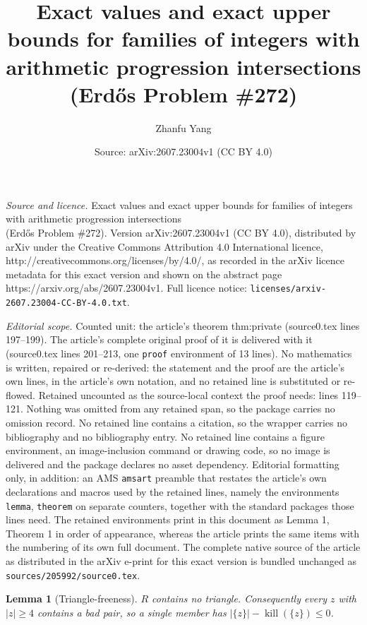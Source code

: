 \documentclass[10pt,a4paper]{amsart}
\title{Exact values and exact upper bounds for families of integers with arithmetic progression intersections\\ \large (Erd\H{o}s Problem \#272)}
\author{Zhanfu Yang}
\date{Source: arXiv:2607.23004v1 (CC BY 4.0)}
\newtheorem{lemma}{Lemma}
\newcommand{\killop}{\operatorname{kill}}
\begin{document}
\maketitle

\noindent\emph{Source and licence.} Exact values and exact upper bounds for families of integers with arithmetic progression intersections\\ \large (Erd\H{o}s Problem \#272). Version arXiv:2607.23004v1 (CC BY 4.0), distributed by arXiv under the Creative Commons Attribution 4.0 International licence, http://creativecommons.org/licenses/by/4.0/, as recorded in the arXiv licence metadata for this exact version and shown on the abstract page https://arxiv.org/abs/2607.23004v1. Full licence notice: \texttt{licenses/arxiv-2607.23004-CC-BY-4.0.txt}.\par\smallskip

\noindent\textit{Editorial scope.} Counted unit: the article's theorem thm:private (source0.tex lines 197--199). The article's complete original proof of it is delivered with it (source0.tex lines 201--213, one \texttt{proof} environment of 13 lines). No mathematics is written, repaired or re-derived: the statement and the proof are the article's own lines, in the article's own notation, and no retained line is substituted or re-flowed.  Retained uncounted as the source-local context the proof needs: lines 119--121.  Nothing was omitted from any retained span, so the package carries no omission record.  No retained line contains a citation, so the wrapper carries no bibliography and no bibliography entry.  No retained line contains a figure environment, an image-inclusion command or drawing code, so no image is delivered and the package declares no asset dependency.  Editorial formatting only, in addition: an AMS \texttt{amsart} preamble that restates the article's own declarations and macros used by the retained lines, namely the environments \texttt{lemma}, \texttt{theorem} on separate counters, together with the standard packages those lines need.  The retained environments print in this document as Lemma 1, Theorem 1 in order of appearance, whereas the article prints the same items with the numbering of its own full document.  The complete native source of the article as distributed in the arXiv e-print for this exact version is bundled unchanged as \texttt{sources/205992/source0.tex}.
\begin{lemma}[Triangle-freeness]\label{lem:tri}
$R$ contains no triangle. Consequently every $z$ with $|z|\ge 4$ contains a bad pair, so a single member has $|\{z\}|-\killop(\{z\})\le 0$.
\end{lemma}
\end{document}
